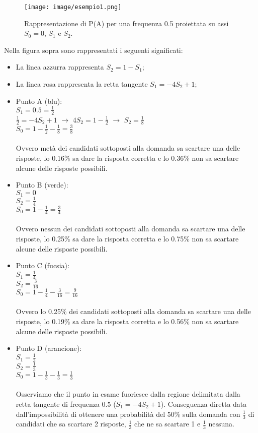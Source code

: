\documentclass[10pt,a4paper]{article}
\begin{document}
\begin{figure}[H]
\centering
	\texttt{[image: image/esempio1.png]}
	\caption{Rappresentazione di P(A) per una frequenza 0.5 proiettata su assi $S_0=0$, $S_1$ e $S_2$.}
\end{figure}

\noindent
Nella figura sopra sono rappresentati i seguenti significati:
\begin{itemize}
\item La linea azzurra rappresenta $S_2=1-S_1$;
\item La linea rosa rappresenta la retta tangente $S_1=-4S_2+1$;
\item Punto A (blu): \\
$S_1=0.5=\frac{1}{2}$ \\
$\frac{1}{2}=-4S_2+1$ $\rightarrow$ $4S_2=1-\frac{1}{2}$ $\rightarrow$ $S_2=\frac{1}{8}$ \\
$S_0=1-\frac{1}{2}-\frac{1}{8}=\frac{3}{8}$\\
\\
Ovvero met\`a dei candidati sottoposti alla domanda sa scartare una delle risposte, lo 0.16\% sa dare la risposta corretta e lo 0.36\% non sa scartare alcune delle risposte possibili.
\item Punto B (verde): \\
$S_1=0$\\
$S_2=\frac{1}{4}$\\
$S_0=1-\frac{1}{4}=\frac{3}{4}$\\
\\
Ovvero nessun dei candidati sottoposti alla domanda sa scartare una delle risposte, lo 0.25\% sa dare la risposta corretta e lo 0.75\% non sa scartare alcune delle risposte possibili.
\item Punto C (fucsia): \\
$S_1=\frac{1}{4}$\\
$S_2=\frac{3}{16}$\\
$S_0=1-\frac{1}{4}-\frac{3}{16}=\frac{9}{16}$\\
\\
Ovvero lo 0.25\% dei candidati sottoposti alla domanda sa scartare una delle risposte, lo 0.19\% sa dare la risposta corretta e lo 0.56\% non sa scartare alcune delle risposte possibili.
\item Punto D (arancione): \\
$S_1=\frac{1}{3}$\\
$S_2=\frac{1}{3}$\\
$S_0=1-\frac{1}{3}-\frac{1}{3}=\frac{1}{3}$\\
\\
Osserviamo che il punto in esame fuoriesce dalla regione delimitata dalla retta tangente di frequenza 0.5 ($S_1=-4S_2+1$). Conseguenza diretta data dall'impossibilit\`a di ottenere una probabilit\`a del 50\% sulla domanda con $\frac{1}{3}$ di candidati che sa scartare 2 risposte, $\frac{1}{3}$ che ne sa scartare 1 e $\frac{1}{3}$ nessuna.
\end{itemize}
\end{document}
